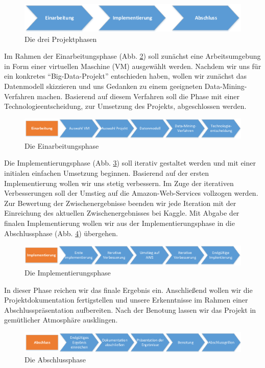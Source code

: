 \begin{figure}[H]
\centering
\includegraphics[width=0.8\linewidth]{Bilder/ProjektplanAllgemein}
\caption{Die drei Projektphasen}
\label{fig:ProjektplanAllgemein}
\end{figure}

Im Rahmen der Einarbeitungsphase (Abb. \ref{fig:ProjektEinarbeitung}) soll zunächst eine Arbeitsumgebung in Form einer virtuellen Maschine (VM) ausgewählt werden. Nachdem wir uns für ein konkretes "`Big-Data-Projekt"' entschieden haben, wollen wir zunächst das Datenmodell skizzieren und uns Gedanken zu einem geeigneten Data-Mining-Verfahren machen. Basierend auf diesem Verfahren soll die Phase mit einer Technologieentscheidung, zur Umsetzung des Projekts, abgeschlossen werden.

\begin{figure}[h]
\centering
\includegraphics[width=1\linewidth]{Bilder/ProjektEinarbeitung}
\caption{Die Einarbeitungsphase}
\label{fig:ProjektEinarbeitung}
\end{figure}

Die Implementierungsphase (Abb. \ref{fig:ProjektImplementierung}) soll iterativ gestaltet werden und mit einer initialen einfachen Umsetzung beginnen. Basierend auf der ersten Implementierung wollen wir uns stetig verbessern. Im Zuge der iterativen Verbesserungen soll der Umstieg auf die Amazon-Web-Services vollzogen werden. Zur Bewertung der Zwischenergebnisse beenden wir jede Iteration mit der Einreichung des aktuellen Zwischenergebnisses bei Kaggle. Mit Abgabe der finalen Implementierung wollen wir aus der Implementierungsphase in die Abschlussphase (Abb. \ref{fig:ProjektAbschluss}) übergehen.

\begin{figure}[h]
\centering
\includegraphics[width=1\linewidth]{Bilder/ProjektImplementierung}
\caption{Die Implementierungsphase}
\label{fig:ProjektImplementierung}
\end{figure}

In dieser Phase reichen wir das finale Ergebnis ein. Anschließend wollen wir die Projektdokumentation fertigstellen und unsere Erkenntnisse im Rahmen einer Abschlusspräsentation aufbereiten. Nach der Benotung lassen wir das Projekt in gemütlicher Atmosphäre ausklingen.

\begin{figure}[h]
\centering
\includegraphics[width=1\linewidth]{Bilder/ProjektAbschluss}
\caption{Die Abschlussphase}
\label{fig:ProjektAbschluss}
\end{figure}
